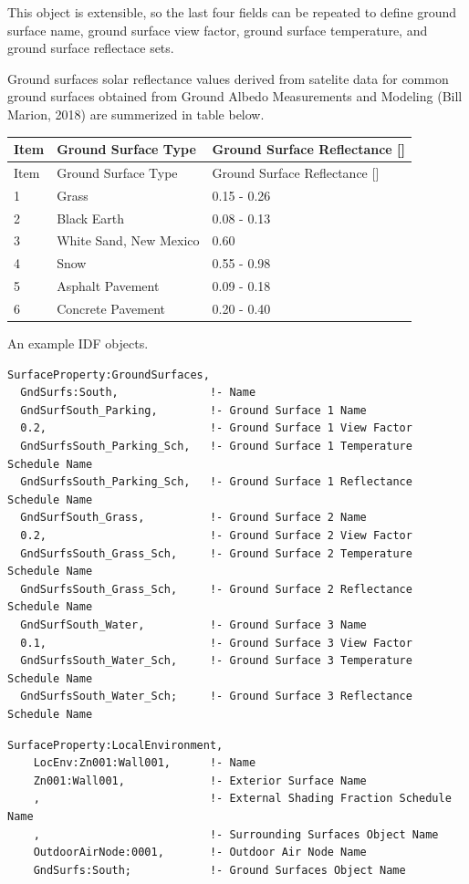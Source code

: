 This object is extensible, so the last four fields can be repeated to define ground surface name, ground surface view factor, ground surface temperature, and ground surface reflectace sets.

Ground surfaces solar reflectance values derived from satelite data for common ground surfaces obtained from Ground Albedo Measurements and Modeling (Bill Marion, 2018) are summerized in table below.

\begin{longtable}[c]{p{1.0in}p{2.5in}p{2.5in}}
\toprule
Item & Ground Surface Type & Ground Surface Reflectance [] \tabularnewline
\midrule
\endfirsthead

\toprule
Item & Ground Surface Type & Ground Surface Reflectance [] \tabularnewline
\midrule
\endhead

1 & Grass & 0.15  -  0.26 \tabularnewline
2 & Black Earth & 0.08  -  0.13 \tabularnewline
3 & White Sand, New Mexico & 0.60 \tabularnewline
4 & Snow & 0.55  -  0.98 \tabularnewline
5 & Asphalt Pavement & 0.09  -  0.18 \tabularnewline
6 & Concrete Pavement & 0.20  -  0.40 \tabularnewline

\bottomrule
\end{longtable}

An example IDF objects.

\begin{lstlisting}
SurfaceProperty:GroundSurfaces,
  GndSurfs:South,              !- Name
  GndSurfSouth_Parking,        !- Ground Surface 1 Name
  0.2,                         !- Ground Surface 1 View Factor
  GndSurfsSouth_Parking_Sch,   !- Ground Surface 1 Temperature Schedule Name
  GndSurfsSouth_Parking_Sch,   !- Ground Surface 1 Reflectance Schedule Name
  GndSurfSouth_Grass,          !- Ground Surface 2 Name
  0.2,                         !- Ground Surface 2 View Factor
  GndSurfsSouth_Grass_Sch,     !- Ground Surface 2 Temperature Schedule Name
  GndSurfsSouth_Grass_Sch,     !- Ground Surface 2 Reflectance Schedule Name
  GndSurfSouth_Water,          !- Ground Surface 3 Name
  0.1,                         !- Ground Surface 3 View Factor
  GndSurfsSouth_Water_Sch,     !- Ground Surface 3 Temperature Schedule Name
  GndSurfsSouth_Water_Sch;     !- Ground Surface 3 Reflectance Schedule Name
\end{lstlisting}

\begin{lstlisting}
SurfaceProperty:LocalEnvironment,
    LocEnv:Zn001:Wall001,      !- Name
    Zn001:Wall001,             !- Exterior Surface Name
    ,                          !- External Shading Fraction Schedule Name
    ,                          !- Surrounding Surfaces Object Name
    OutdoorAirNode:0001,       !- Outdoor Air Node Name
    GndSurfs:South;            !- Ground Surfaces Object Name
\end{lstlisting}

